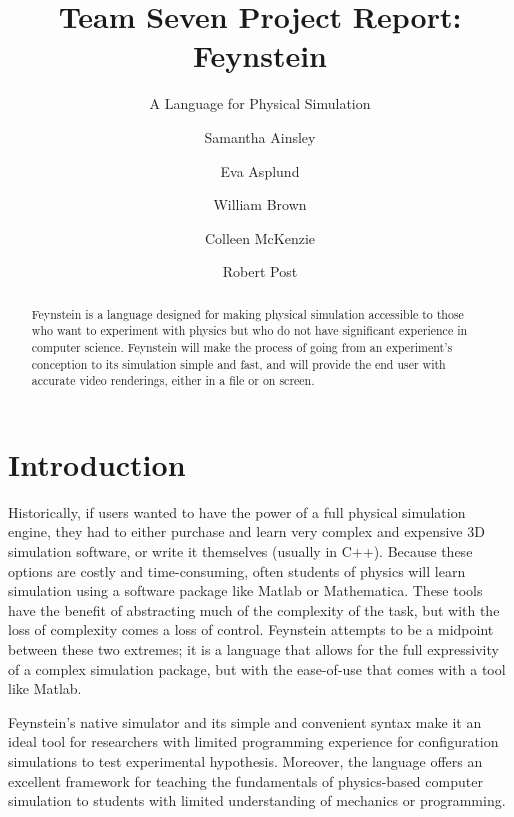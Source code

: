 
\title{Team Seven Project Report: Feynstein}
\subtitle{A Language for Physical Simulation}

\author{Samantha Ainsley \and Eva Asplund \and William Brown \and
  Colleen McKenzie \and Robert Post}

\newtoggle{tutorial}
\newtoggle{manual}
\newtoggle{listing}

\toggletrue{tutorial}
\toggletrue{manual}
\toggletrue{listing}


\maketitle

\begin{abstract}
  Feynstein is a language designed for making physical simulation
  accessible to those who want to experiment with physics but who do not
  have significant experience in computer science. Feynstein will make
  the process of going from an experiment’s conception to its simulation
  simple and fast, and will provide the end user with accurate video
  renderings, either in a file or on screen.
\end{abstract}

\tableofcontents

\section{Introduction}

Historically, if users wanted to have the power of a full physical
simulation engine, they had to either purchase and learn very complex
and expensive 3D simulation software, or write it themselves (usually
in C++). Because these options are costly and time-consuming, often
students of physics will learn simulation using a software package
like Matlab or Mathematica. These tools have the benefit of
abstracting much of the complexity of the task, but with the loss of
complexity comes a loss of control. Feynstein attempts to be a
midpoint between these two extremes; it is a language that allows for
the full expressivity of a complex simulation package, but with the
ease-of-use that comes with a tool like Matlab.

Feynstein's native simulator and its simple and convenient syntax make
it an ideal tool for researchers with limited programming experience
for configuration simulations to test experimental
hypothesis. Moreover, the language offers an excellent framework for
teaching the fundamentals of physics-based computer simulation to
students with limited understanding of mechanics or programming.

